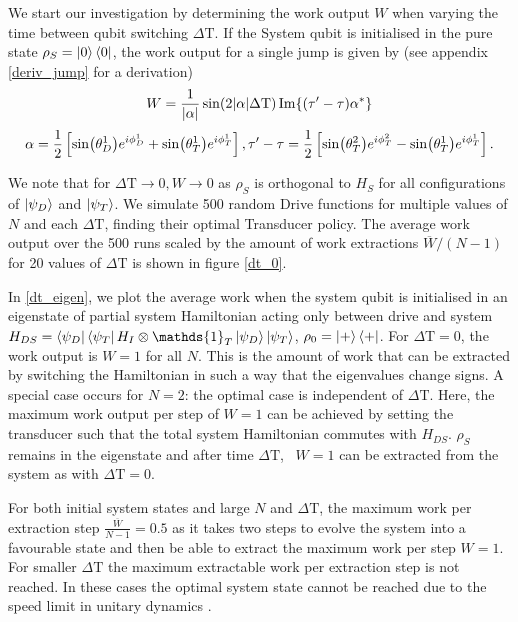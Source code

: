 We start our investigation by determining the work output $W$ when varying the time between qubit switching $\Delta \mathrm{T}$.
If the System qubit is initialised in the pure state $\rho_S = \ket{0} \bra{0}$, the work output for a single jump is given by (see appendix \ref{deriv_jump} for a derivation)
\begin{equation} \label{single_work}
	W = \frac{1}{\abs{\alpha}} \sin(2\abs{\alpha}\Delta \mathrm{T}) \Im{(\tau' - \tau) \alpha^*}
\end{equation}
\begin{equation*}
	\alpha = \frac{1}{2} \left[\sin(\theta_D^1) e^{i\phi_D^1} + \sin(\theta_T^1) e^{i\phi_T^1}\right], \\
	\tau' - \tau = \frac{1}{2} \left[ \sin(\theta_T^2)e^{i\phi_T^2} - \sin(\theta_T^1)e^{i\phi_T^1} \right].
\end{equation*}

We note that for $\Delta \mathrm{T} \to 0, W \to 0$ as $\rho_S$ is orthogonal to $H_S $ for all configurations of $\ket{\psi_D}$ and $ \ket{\psi_T}$.
We simulate 500 random Drive functions for multiple values of $N$ and each $\Delta \mathrm{T}$, finding their optimal Transducer policy. The average work output over the 500 runs scaled by the amount of work extractions $\overline{W}/(N-1)$ for 20 values of $\Delta \mathrm{T}$ is shown in figure \ref{dt_0}.

In \ref{dt_eigen}, we plot the average work when the system qubit is initialised in an eigenstate of partial system Hamiltonian acting only between drive and system $H_{DS} = \bra{\psi_D}\bra{\psi_T} H_I \otimes \mathds{1}_T \ket{\psi_D} \ket{\psi_T}$, $\rho_0 = \ket{+}\bra{+}$.
For $\Delta \mathrm{T} = 0$, the work output is $W = 1$ for all $N$. This is the amount of work that can be extracted by switching the Hamiltonian in such a way that the eigenvalues change signs.
A special case occurs for $N = 2$: the optimal case is independent of $\Delta \mathrm{T}$.
Here, the maximum work output per step of $W = 1$ can be achieved by setting the transducer such that the total system Hamiltonian commutes with $H_{DS}$. $\rho_S$ remains in the eigenstate and after time $\Delta \mathrm{T}$, \ $W = 1$ can be extracted from the system as with $\Delta \mathrm{T} = 0$.

For both initial system states and large $N$ and $\Delta \mathrm{T}$, the maximum work per extraction step $\frac{\overline{W}}{N-1} = 0.5$ as it takes two steps to evolve the system into a favourable state and then be able to extract the maximum work per step $W = 1$.
For smaller $\Delta \mathrm{T}$ the maximum extractable work per extraction step is not reached. In these cases the optimal system state cannot be reached due to the speed limit in unitary dynamics \cite{Deffner_2017, PhysRevA.67.052109}.

